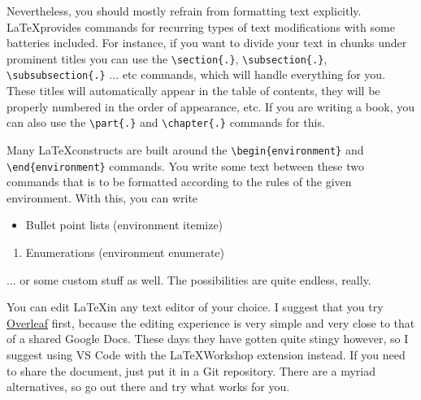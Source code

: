 \documentclass[9pt,a4paper,twoside]{tau-class/tau}
\begin{document}
    Nevertheless, you should mostly refrain from formatting text explicitly. \LaTeX provides commands for recurring types of  text modifications with some batteries included. For instance, if you want to divide your text in chunks under prominent titles you can use the \verb|\section{.}|, \verb|\subsection{.}|, \verb|\subsubsection{.}| ... etc commands, which will handle everything for you. These titles will automatically appear in the table of contents, they will be properly numbered in the order of appearance, etc. If you are writing a book, you can also use the \verb|\part{.}| and \verb|\chapter{.}| commands for this.

    Many \LaTeX constructs are built around the \verb|\begin{environment}| and \verb|\end{environment}| commands. You write some text between these two commands that is to be formatted according to the rules of the given environment. With this, you can write

    \begin{itemize}
        \item Bullet point lists (environment itemize)
    \end{itemize}

    \begin{enumerate}
        \item Enumerations (environment enumerate)
    \end{enumerate}

    \begin{info}
        ... or some custom stuff as well. The possibilities are quite endless, really.
    \end{info}

    You can edit \LaTeX in any text editor of your choice. I suggest that you try \href{https://www.overleaf.com/}{Overleaf} first, because the editing experience is very simple and very close to that of a shared Google Docs. These days they have gotten quite stingy however, so I suggest using VS Code with the \LaTeX Workshop extension instead. If you need to share the document, just put it in a Git repository. There are a myriad alternatives, so go out there and try what works for you.
		
\end{document}
